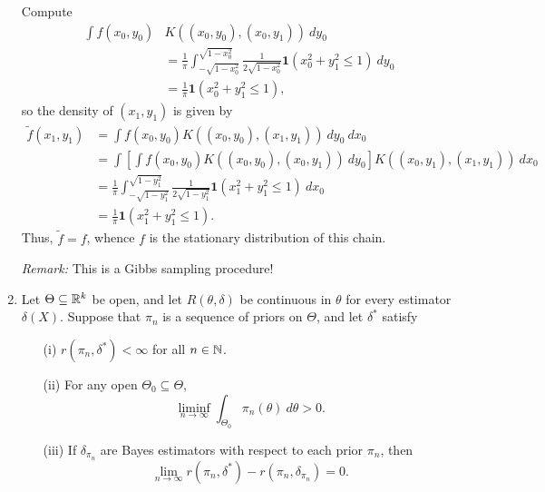 \documentclass[11pt]{article}
\begin{document}
\begin{enumerate}
        Compute \begin{align*}
            \int f(x_0, y_0) &K((x_0, y_0), (x_0, y_1)) \:dy_0 \\
                &= \frac{1}{\pi} \int_{-\sqrt{1 - x_0^2}}^{\sqrt{1 - x_0^2}} \frac{1}{2\sqrt{1 - x_0^2}} \bm{1}\left(x_0^2 + y_1^2 \leq 1\right)\:dy_0 \\
                &= \frac{1}{\pi} \bm{1}\left(x_0^2 + y_1^2 \leq 1\right),
        \end{align*}
        so the density of $(x_1, y_1)$ is given by \begin{align*}
            \tilde{f}(x_1, y_1)
                &= \int f(x_0, y_0) K((x_0, y_0), (x_1, y_1)) \:dy_0\:dx_0 \\
                &= \int \left[\int f(x_0, y_0) K((x_0, y_0), (x_0, y_1)) \:dy_0\right] K((x_0, y_1), (x_1, y_1))\:dx_0 \\
                &= \frac{1}{\pi}\int_{-\sqrt{1 - y_1^2}}^{\sqrt{1 - y_1^2}} \frac{1}{2\sqrt{1 - y_1^2}} \bm{1}\left(x_1^2 + y_1^2 \leq 1\right)\:dx_0 \\
                &= \frac{1}{\pi} \bm{1}\left(x_1^2 + y_1^2 \leq 1\right).
        \end{align*}
        Thus, $\tilde{f} = f$, whence $f$ is the stationary distribution of
        this chain.

        \emph{Remark:} This is a Gibbs sampling procedure!


        \item Let $\Theta\subseteq \mathbb{R}^k$ be open, and let $R(\theta, \delta)$ be
        continuous in $\theta$ for every estimator $\delta(X)$.
        Suppose that $\pi_n$ is a sequence of priors on $\Theta$, and let
        $\delta^*$ satisfy \begin{enumerate}
            \item[(i)] $r(\pi_n, \delta^*) < \infty$ for all $n \in \mathbb{N}$.
            \item[(ii)] For any open $\Theta_0 \subseteq \Theta$, \[
                \liminf_{n \to \infty} \int_{\Theta_0} \pi_n(\theta) \:d\theta > 0.
            \]
            \item[(iii)] If $\delta_{\pi_n}$ are Bayes estimators with respect
            to each prior $\pi_n$, then \[
                \lim_{n \to \infty} r(\pi_n, \delta^*) - r(\pi_n, \delta_{\pi_n}) = 0.
            \]
        \end{enumerate}


\end{enumerate}
\end{document}
